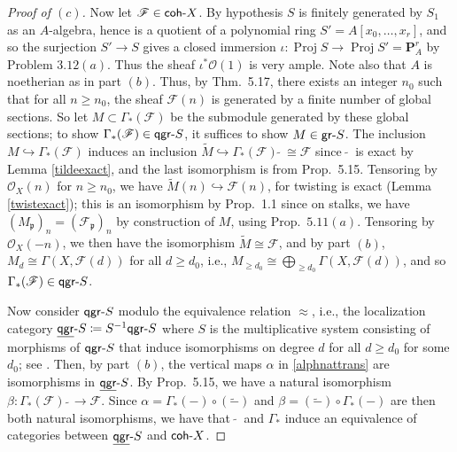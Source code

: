 \documentclass[12pt,letterpaper]{article}
\theoremstyle{definition}
\theoremstyle{remark}
\numberwithin{equation}{section}
\numberwithin{figure}{problem}
\DeclareMathOperator{\Proj}{Proj}
\newcommand{\FF}{\mathscr{F}}
\newcommand{\OO}{\mathcal{O}}
\newcommand{\gr}{\mathsf{gr}\mathchar`-}
\newcommand{\qgr}{\mathsf{qgr}\mathchar`-}
\newcommand{\uqgr}{\underline{\mathsf{qgr}}\mathchar`-}
\newcommand{\coh}{\mathsf{coh}\mathchar`-}
\begin{document}
\begin{proof}[Proof of $(c)$]
  \par Now let $\FF \in \coh X$. By hypothesis $S$ is finitely generated by $S_1$ as an $A$-algebra, hence is a quotient of a polynomial ring $S' = A[x_0,\ldots,x_r]$, and so the surjection $S' \to S$ gives a closed immersion $\iota\colon\Proj S \to \Proj S' = \mathbf{P}^r_A$ by Problem $3.12(a)$. Thus the sheaf $\iota^*\OO(1)$ is very ample. Note also that $A$ is noetherian as in part $(b)$. Thus, by Thm.~5.17, there exists an integer $n_0$ such that for all $n \ge n_0$, the sheaf $\FF(n)$ is generated by a finite number of global sections. So let $M \subset \Gamma_*(\FF)$ be the submodule generated by these global sections; to show $\Gamma_*(\FF) \in \qgr S$, it suffices to show $M \in \gr S$. The inclusion $M \hookrightarrow \Gamma_*(\FF)$ induces an inclusion $\tilde{M} \hookrightarrow \Gamma_*(\FF)\:\tilde{}\: \cong \FF$ since $\:\tilde{}\:$ is exact by Lemma \ref{tildeexact}, and the last isomorphism is from Prop.~5.15. Tensoring by $\OO_X(n)$ for $n \ge n_0$, we have $\tilde{M}(n) \hookrightarrow \FF(n)$, for twisting is exact (Lemma \ref{twistexact}); this is an isomorphism by Prop.~1.1 since on stalks, we have $(M_\mathfrak{p})_n = (\FF_\mathfrak{p})_n$ by construction of $M$, using Prop.~$5.11(a)$. Tensoring by $\OO_X(-n)$, we then have the isomorphism $\tilde{M} \cong \FF$, and by part $(b)$, $M_d \cong \Gamma(X,\FF(d))$ for all $d \ge d_0$, i.e., $M_{\ge d_0} \cong \bigoplus_{\ge d_0} \Gamma(X,\FF(d))$, and so $\Gamma_*(\FF) \in \qgr S$.
  \par Now consider $\qgr S$ modulo the equivalence relation $\approx$, i.e., the localization category $\uqgr S \coloneqq S^{-1}\qgr S$ where $S$ is the multiplicative system consisting of morphisms of $\qgr S$ that induce isomorphisms on degree $d$ for all $d \ge d_0$ for some $d_0$; see \cite[\S10.3, spec.~Exc.~10.3.2]{Wei94}. Then, by part $(b)$, the vertical maps $\alpha$ in \eqref{alphnattrans} are isomorphisms in $\uqgr S$. By Prop.~5.15, we have a natural isomorphism $\beta\colon \Gamma_*(\FF)\:\tilde\: \to \FF$. Since $\alpha = \Gamma_*(-) \circ (\tilde{-})$ and $\beta = (\tilde{-}) \circ \Gamma_*(-)$ are then both natural isomorphisms, we have that $\:\tilde{}\:$ and $\Gamma_*$ induce an equivalence of categories between $\uqgr S$ and $\coh X$.
\end{proof}
\end{document}
